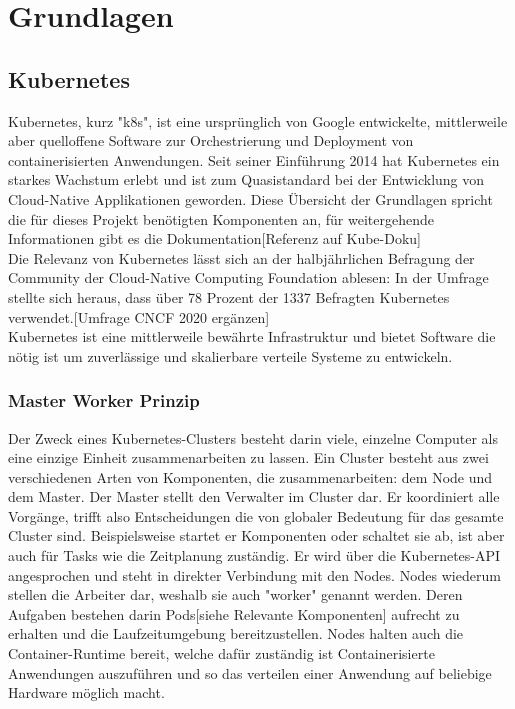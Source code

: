 \documentclass[a4paper,10pt]{scrartcl}
\begin{document}
\pagebreak

\section{Grundlagen}
\subsection{Kubernetes}

Kubernetes, kurz "k8s", ist eine ursprünglich von Google entwickelte, mittlerweile aber quelloffene Software zur Orchestrierung und Deployment von containerisierten Anwendungen. Seit seiner Einführung 2014 hat Kubernetes ein starkes Wachstum erlebt und ist zum Quasistandard bei der Entwicklung von Cloud-Native Applikationen geworden.
Diese Übersicht der Grundlagen spricht die für dieses Projekt benötigten Komponenten an, für weitergehende Informationen gibt es die Dokumentation[Referenz auf Kube-Doku]\\

Die Relevanz von Kubernetes lässt sich an der halbjährlichen Befragung der Community der Cloud-Native Computing Foundation ablesen:
In der Umfrage stellte sich heraus, dass über 78 Prozent der 1337 Befragten Kubernetes verwendet.[Umfrage CNCF 2020 ergänzen]\\


Kubernetes ist eine mittlerweile bewährte Infrastruktur und bietet Software die nötig ist um zuverlässige und skalierbare verteile Systeme zu entwickeln. \cite{Burns.2019} \\
\subsubsection{Master Worker Prinzip}
Der Zweck eines Kubernetes-Clusters besteht darin viele, einzelne Computer als eine einzige Einheit zusammenarbeiten zu lassen.
Ein Cluster besteht aus zwei verschiedenen Arten von Komponenten, die zusammenarbeiten:
dem Node und dem Master.
Der Master stellt den Verwalter im Cluster dar. Er koordiniert alle Vorgänge, trifft also Entscheidungen die von globaler Bedeutung für das gesamte Cluster sind. Beispielsweise startet er Komponenten oder schaltet sie ab, ist aber auch für Tasks wie die Zeitplanung zuständig. Er wird über die Kubernetes-API angesprochen und steht in direkter Verbindung mit den Nodes.\cite{.20200530T15:19:3404:00} \cite{.20200316T05:14:35+01:00}
Nodes wiederum stellen die Arbeiter dar, weshalb sie auch "worker" genannt werden. Deren Aufgaben bestehen darin Pods[siehe Relevante Komponenten] aufrecht zu erhalten und die Laufzeitumgebung bereitzustellen. Nodes halten auch die Container-Runtime bereit, welche dafür zuständig ist Containerisierte Anwendungen auszuführen und so das verteilen einer Anwendung auf beliebige Hardware möglich macht.
\end{document}
